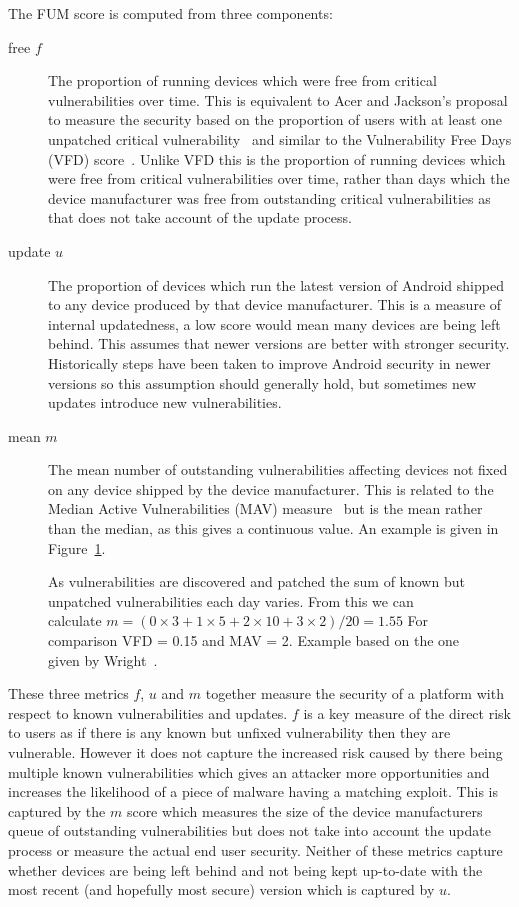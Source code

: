 The FUM score is computed from three components:
\begin{description}
  \item[free $f$] The proportion of running devices which were free from critical vulnerabilities over time. This is equivalent to Acer and Jackson's proposal to measure the security based on the proportion of users with at least one unpatched critical vulnerability~\cite{Acer2010} and similar to the Vulnerability Free Days (VFD) score~\cite{Wright2014}.
  Unlike VFD this is the proportion of running devices which were free from critical vulnerabilities over time, rather than days which the device manufacturer was free from outstanding critical vulnerabilities as that does not take account of the update process.
  \item[update $u$] The proportion of devices which run the latest version of Android shipped to any device produced by that device manufacturer. This is a measure of internal updatedness, a low score would mean many devices are being left behind.
  This assumes that newer versions are better with stronger security.
  Historically steps have been taken to improve Android security in newer versions so this assumption should generally hold, but sometimes new updates introduce new vulnerabilities.
  \item[mean $m$] The mean number of outstanding vulnerabilities affecting devices not fixed on any device shipped by the device manufacturer. This is related to the Median Active Vulnerabilities (MAV) measure~\cite{Wright2014} but is the mean rather than the median, as this gives a continuous value.
  An example is given in Figure~\ref{fig:mcalculation}.
\end{description}

\begin{figure}
\centering

\caption{As vulnerabilities are discovered and patched the sum of known but unpatched vulnerabilities each day varies. From this we can calculate $m = (0 \times 3 + 1 \times 5 + 2 \times 10 + 3 \times 2) / 20 = 1.55$ For comparison VFD = 0.15 and MAV = 2. Example based on the one given by Wright~\cite{Wright2014}.}
\label{fig:mcalculation}
\end{figure}

These three metrics $f$, $u$ and $m$ together measure the security of a platform with respect to known vulnerabilities and updates.
$f$ is a key measure of the direct risk to users as if there is any known but unfixed vulnerability then they are vulnerable.
However it does not capture the increased risk caused by there being multiple known vulnerabilities which gives an attacker more opportunities and increases the likelihood of a piece of malware having a matching exploit.
This is captured by the $m$ score which measures the size of the device manufacturers queue of outstanding vulnerabilities but does not take into account the update process or measure the actual end user security.
Neither of these metrics capture whether devices are being left behind and not being kept up-to-date with the most recent (and hopefully most secure) version which is captured by $u$.

